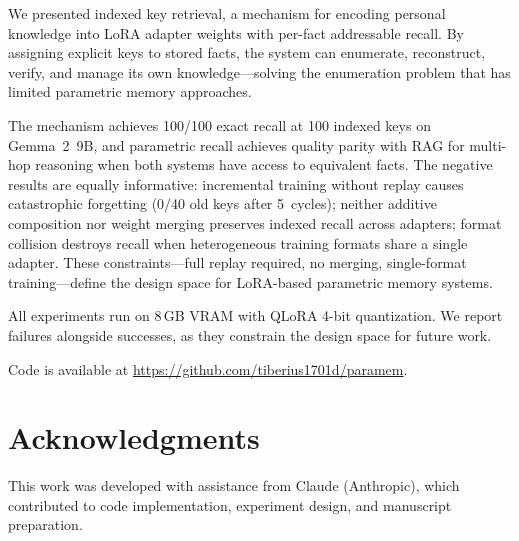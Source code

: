 \documentclass[11pt]{article}
\begin{document}
We presented indexed key retrieval, a mechanism for encoding personal knowledge into LoRA adapter weights with per-fact addressable recall.
By assigning explicit keys to stored facts, the system can enumerate, reconstruct, verify, and manage its own knowledge---solving the enumeration problem that has limited parametric memory approaches.

The mechanism achieves 100/100 exact recall at 100 indexed keys on Gemma~2~9B, and parametric recall achieves quality parity with RAG for multi-hop reasoning when both systems have access to equivalent facts.
The negative results are equally informative: incremental training without replay causes catastrophic forgetting (0/40 old keys after 5~cycles); neither additive composition nor weight merging preserves indexed recall across adapters; format collision destroys recall when heterogeneous training formats share a single adapter.
These constraints---full replay required, no merging, single-format training---define the design space for LoRA-based parametric memory systems.

All experiments run on 8\,GB VRAM with QLoRA 4-bit quantization.
We report failures alongside successes, as they constrain the design space for future work.

Code is available at \url{https://github.com/tiberius1701d/paramem}.


\section*{Acknowledgments}

This work was developed with assistance from Claude (Anthropic), which contributed to code implementation, experiment design, and manuscript preparation.


{\small


}
\end{document}
